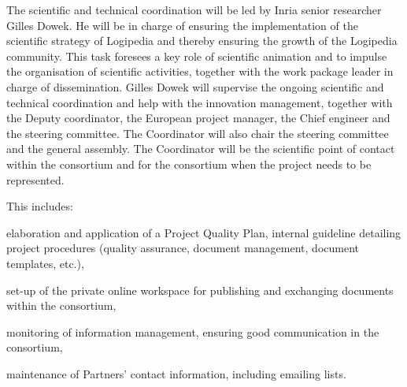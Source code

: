 \begin{workpackage}[id=management,type=MGT,wphases=1-48,
  short=Management,
  title=Management,
  lead=Inr,InrRM=34,InnRM=2,SacRM=2,TumRM=2,LieRM=2,BelRM=2,DelRM=2,FauRM=2]
\begin{tasklist}
  \begin{task}[id=coordination,title=Scientific and technical coordination,shorttitle=Sci.\&tech.,lead=Inr,InrRM=10,wphases=1-48]
    The scientific and technical coordination will be led by Inria
    senior researcher Gilles Dowek. He will be in charge of ensuring
    the implementation of the scientific strategy of Logipedia and
    thereby ensuring the growth of the Logipedia community. This task
    foresees a key role of scientific animation and to impulse the
    organisation of scientific activities, together with the work package
    leader
    in charge of dissemination. Gilles Dowek will supervise the
    ongoing scientific and technical coordination and help with the
    innovation management, together with the Deputy coordinator,
    the European project manager, 
    the
    Chief engineer and the steering committee. The
    Coordinator will also chair the steering committee and the general
    assembly. The Coordinator will be the scientific point of contact
    within the consortium and for the consortium when the project
    needs to be represented.
  \end{task}


  \begin{task}[id=quality,title=Quality management,shorttitle=Sci.\&tech.,lead=Inr,InrRM=10,wphases=1-48]
    This includes:
\begin{compactitem}
\item
  elaboration and application of a Project Quality Plan, internal
  guideline detailing project procedures (quality assurance, document
  management, document templates, etc.),
\item
  set-up of the private online workspace for publishing and exchanging
  documents within the consortium, 
\item
  monitoring of information management, ensuring good communication
  in the consortium,
\item
  maintenance of Partners’ contact information, including emailing lists.
\end{compactitem}
\end{task}


\end{tasklist}
\end{workpackage}
